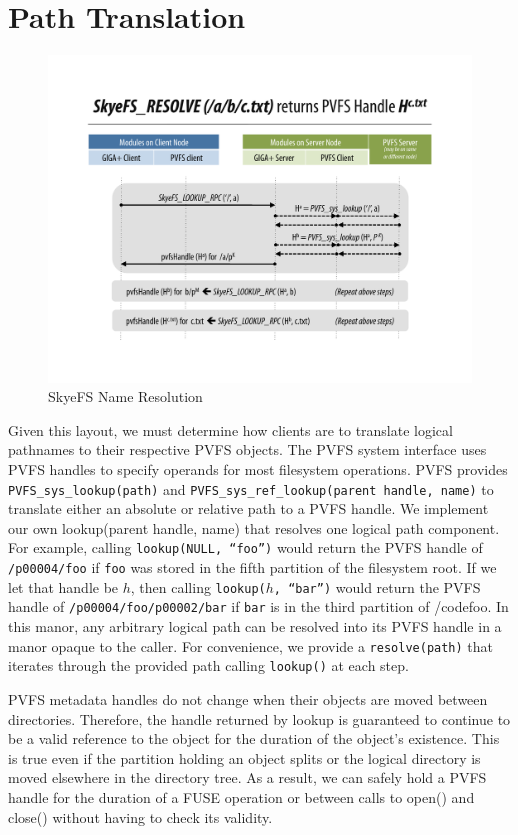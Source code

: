 \documentclass[letterpaper]{article}
\newcommand{\code}[1]{\texttt{#1}}
\begin{document}
\section{Path Translation}
\begin{figure}
\begin{center}
\includegraphics[scale=0.4]{figure-resolve}
\end{center}
\caption{SkyeFS Name Resolution}
\end{figure}
Given this layout, we must determine how clients are to translate logical
pathnames to their respective PVFS objects.  The PVFS system interface uses PVFS
handles to specify operands for most filesystem operations.  PVFS provides
\code{PVFS\_\-sys\_\-lookup(path)} and \code{PVFS\_\-sys\_\-ref\_\-lookup(parent handle, name)}
to translate either an absolute or relative path to a PVFS handle.  We implement
our own lookup(parent handle, name) that resolves one logical path component.
For example, calling \code{lookup(NULL, ``foo'')} would return the PVFS handle
of \code{/p00004/foo} if \code{foo} was stored in the fifth partition of the
filesystem root.  If we let that handle be $h$, then calling \code{lookup($h$,
``bar'')} would return the PVFS handle of \code{/p00004/foo/p00002/bar} if
\code{bar} is in the third partition of /code{foo}.  In this manor, any
arbitrary logical path can be resolved into its PVFS handle in a manor opaque to
the caller.  For convenience, we provide a \code{resolve(path)} that iterates
through the provided path calling \code{lookup()} at each step.

PVFS metadata handles do not change when their objects are moved between
directories.  Therefore, the handle returned by lookup is guaranteed to continue
to be a valid reference to the object for the duration of the object's
existence.  This is true even if the partition holding an object splits or the
logical directory is moved elsewhere in the directory tree.  As a result, we can
safely hold a PVFS handle for the duration of a FUSE operation or between calls
to open() and close() without having to check its validity.
\end{document}
